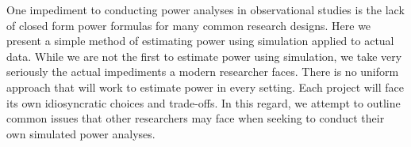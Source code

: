 \documentclass[12pt]{article}%
\begin{document}
One impediment to conducting power analyses in observational studies is the lack of closed form power formulas for many common research designs.  
Here we present a simple method of estimating power using simulation applied to actual data. 
While we are not the first to estimate power using simulation, we take very seriously the actual impediments a modern researcher faces. 
There is no uniform approach that will work to estimate power in every setting. 
Each project will face its own idiosyncratic choices and trade-offs. 
In this regard, we attempt to outline common issues that other researchers may face when seeking to conduct their own simulated power analyses.


\newpage
\vspace{-.5cm}
\setlength{\bibsep}{0.3pt}
\begin{spacing}{.85}

{}
\end{spacing}
\end{document}
